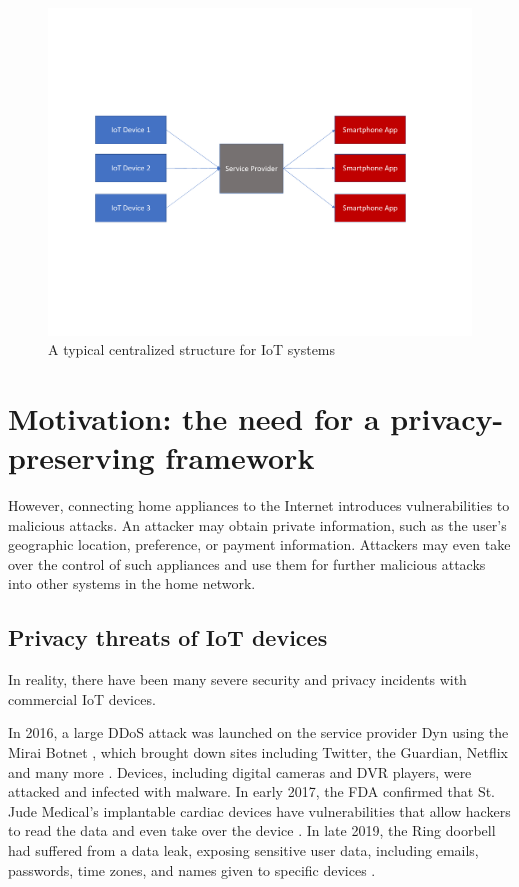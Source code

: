 \begin{figure}
	\centering
	\includegraphics[width=0.9\linewidth]{centralized_structure.pdf}
	\caption{A typical centralized structure for IoT systems}
	\label{fig:centralized}
\end{figure}

\section{Motivation: the need for a privacy-preserving framework}
However, connecting home appliances to the Internet introduces vulnerabilities to malicious attacks. An attacker may obtain private information, such as the user's geographic location, preference, or payment information. Attackers may even take over the control of such appliances and use them for further malicious attacks into other systems in the home network. 

\subsection{Privacy threats of IoT devices}
In reality, there have been many severe security and privacy incidents with commercial IoT devices.

In 2016, a large DDoS attack was launched on the service provider Dyn using the Mirai Botnet \cite{antonakakis2017understanding}, which brought down sites including Twitter, the Guardian, Netflix and many more \cite{2006mirai}. Devices, including digital cameras and DVR players, were attacked and infected with malware. In early 2017, the FDA confirmed that St. Jude Medical's implantable cardiac devices have vulnerabilities that allow hackers to read the data and even take over the device \cite{2017fda}. In late 2019, the Ring doorbell had suffered from a data leak, exposing sensitive user data, including emails, passwords, time zones, and names given to specific devices \cite{2019ring}.


